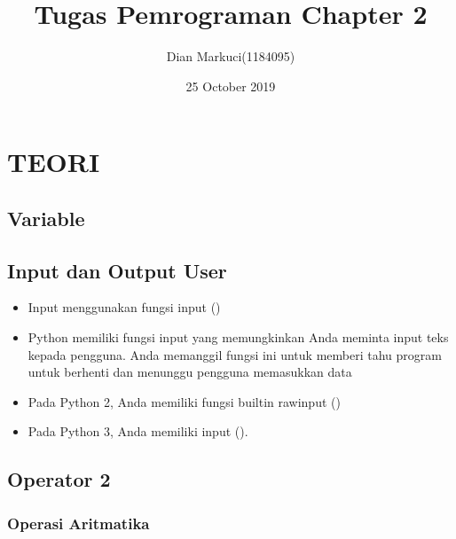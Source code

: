 \documentclass{article}
\title{Tugas Pemrograman Chapter 2}
\author{Dian Markuci(1184095) }
\date{25 October 2019}
\begin{document}
\maketitle

\section{TEORI}
\subsection{Variable}
\usepackage{Variabel merupakan suatu tempat untuk menampung value dimemori, ibarat sebuah ruangan, variabel dibagi menjadi dua berdasar ruang lingkup yaitu variable global dan lokal, untuk menentukan variabel global atau lokal, tergantung dari tempat dideklarasikannya variabel pada program yang sedang dibangun. Variabel global adalah variabel yang bisa diakses di semua lingkup  dalam program yang sedang dibuat, atau disebut variabel global ini bisa dikenali oleh semua fungsi dan prosedur, sementara variabel lokal adalah variabel yang dapat diakses hanya di lingkup khusus,atau variabel lokal ini hanya bisa diakses pada fungsi/prosedur dimana variabel itu dideklarasikan.}

\subsection{Input dan Output User}
\begin{itemize}
    \item Input menggunakan fungsi input ()
    \item Python memiliki fungsi input yang memungkinkan Anda meminta input teks kepada pengguna. Anda memanggil fungsi ini untuk memberi tahu program untuk berhenti dan menunggu pengguna memasukkan data
    \item Pada Python 2, Anda memiliki fungsi built\textunderscore in raw\textunderscore input ()
    \item Pada Python 3, Anda memiliki input ().\\
    
\end{itemize}

\subsection{Operator 2}
\subsubsection{Operasi Aritmatika}
\end{document}

